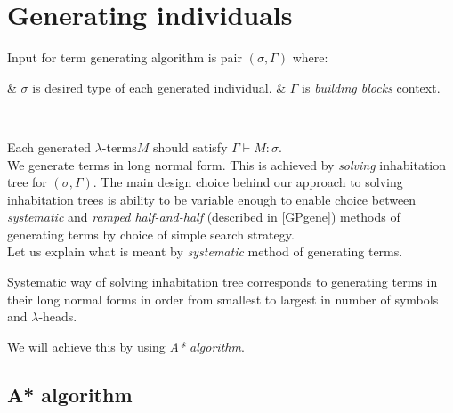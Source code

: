 \documentclass[12pt,a4paper]{report}
\newcommand{\Lets}{Let us\xspace}
\newcommand{\lterms}{$\lambda$-terms\xspace}
\newcommand{\lheads}{$\lambda$-heads\xspace}
\newcommand{\turst}[3]{$#1\vdash{}#2:#3$\xspace}
\newcommand{\GMS}{\turst{\Gamma}{M}{\sigma}}
\newenvironment{enum}
{\begin{easylist}[itemize]}
{\end{easylist}}
\newenvironment{todo}
{ ~\\[0.5em]
  {\color{red}\textbf{TODO}}
  \begin{easylist}[itemize]}
{ \end{easylist}
  ~}
\begin{document}
\section{Generating individuals}



Input for term generating algorithm is pair $(\sigma,\Gamma)$ where:\\

\begin{enum}
 & $\sigma$ is desired type of each generated individual.
 & $\Gamma$ is \textit{building blocks} context. 
\end{enum}~
 
Each generated \lterms $M$ should  satisfy \GMS. \\

We generate terms in long normal form.
This is achieved by \textit{solving} inhabitation tree for $(\sigma,\Gamma)$.  
The main design choice behind our approach to solving inhabitation trees
is ability to be variable enough to enable choice between 
\textit{systematic}  
and \textit{ramped half-and-half} (described in \ref{GPgene}) 
methods of generating terms 
by choice of simple search strategy.\\

\Lets explain what is meant by \textit{systematic} 
method of generating terms. 

Systematic way of solving inhabitation tree corresponds to
generating terms in their long normal forms
in order from smallest to largest in number of symbols and \lheads.

We will achieve this by using \textit{A* algorithm}. 



\subsection{A* algorithm}
\end{document}
